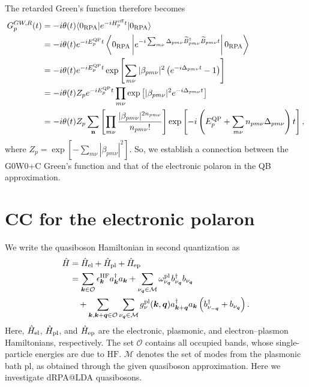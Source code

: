 The retarded Green's function therefore becomes
\begin{align}
G_p^{GW,R}(t)
&=
-i\theta(t)
\langle
0_{\rm RPA}
|
e^{-iH_p^{\rm eff}t}
|
0_{\rm RPA}
\rangle
\\
&=
-i\theta(t)
e^{-iE_p^{\rm QP}t}
\left\langle
0_{\rm RPA}
\left|
e^{-i\sum_{m\nu}
\Delta_{pm\nu}
\widetilde B_{pm\nu}^{\dagger}
\widetilde B_{pm\nu}t}
\right|
0_{\rm RPA}
\right\rangle
\\
&=
-i\theta(t)
e^{-iE_p^{\rm QP}t}
\exp
\left[
\sum_{m\nu}
|\beta_{pm\nu}|^2
\left(
e^{-i\Delta_{pm\nu}t}
-
1
\right)
\right]\\
&=
-i\theta(t)
Z_p
e^{-iE_p^{\rm QP}t}
\prod_{m\nu}
\exp
\left[
|\beta_{pm\nu}|^2
e^{-i\Delta_{pm\nu}t}
\right]
\\
&=
-i\theta(t)
Z_p
\sum_{\mathbf n}
\left[
\prod_{m\nu}
\frac{
|\beta_{pm\nu}|^{2n_{pm\nu}}
}{
n_{pm\nu}!
}
\right]
\exp
\left[
-i
\left(
E_p^{\rm QP}
+
\sum_{m\nu}
n_{pm\nu}
\Delta_{pm\nu}
\right)
t
\right],
\end{align}
where $
Z_p
=
\exp
\left[
-
\sum_{m\nu}
|\beta_{pm\nu}|^2
\right].
$ So, we establish a connection between the G0W0+C Green's function and that of the electronic polaron in the QB approximation.

\section{CC for the electronic polaron}
We write the quasiboson Hamiltonian in second quantization as
\begin{align}
\hat{H}
&=
\hat{H}_{\rm el}
+
\hat{H}_{\rm pl}
+
\hat{H}_{\rm ep}
\\
&=
\sum_{\bm{k}\in\mathcal{O}}
\epsilon_{\bm{k}}^{\rm HF}
a_{\bm{k}}^{\dagger}a_{\bm{k}}
+
\sum_{\nu_{\bm{q}}\in\mathcal{M}}
\omega_{\nu_{\bm{q}}}^{\rm pl}
b_{\nu_{\bm{q}}}^{\dagger}
b_{\nu_{\bm{q}}}
\nonumber\\
&\quad
+
\sum_{\bm{k},\bm{k}+\bm{q}\in\mathcal{O}}
\sum_{\nu_{\bm{q}}\in\mathcal{M}}
g_{\nu}^{\rm pl}(\bm{k},\bm{q})
a_{\bm{k}+\bm{q}}^{\dagger}
a_{\bm{k}}
\left(
b_{\nu_{-\bm{q}}}^{\dagger}
+
b_{\nu_{\bm{q}}}
\right).
\label{eq:H}
\end{align}
Here, $\hat{H}_{\rm el}$, $\hat{H}_{\rm pl}$, and
$\hat{H}_{\rm ep}$ are the electronic, plasmonic, and
electron--plasmon Hamiltonians, respectively.
The set $\mathcal{O}$ contains all occupied bands, whose single-particle energies are due to $\mathrm{HF}$. $\mathcal{M}$ denotes
the set of modes from the plasmonic bath $\mathrm{pl}$, as obtained through the given quasiboson approximation. 
Here we investigate dRPA@LDA quasibosons.
